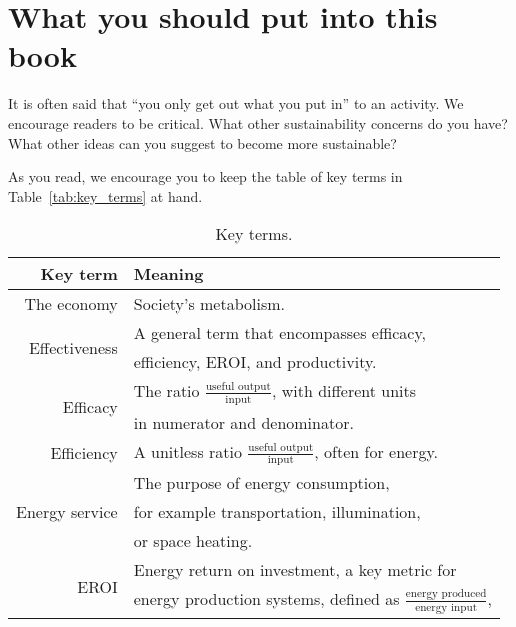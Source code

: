 {\section*{What you should put into this book} 

It is often said that ``you only get out what you put in'' to an activity.
We encourage readers to be critical.
What other sustainability concerns do you have?
What other ideas can you suggest to become more sustainable?

As you read, we encourage you to keep the table of key terms in Table~\ref{tab:key_terms} at hand.

\begin{table}[h!]
\caption{Key terms.}
\centering
\begin{tabular}{r l}
\toprule
Key term              & Meaning  \\ 
\midrule  
The economy           & Society's metabolism. \vspace{4mm} \\
%
\multirow{2}{*}{Effectiveness}  & A general term that encompasses efficacy, \\
                                & efficiency, EROI, and productivity. \vspace{4mm} \\
%
\multirow{2}{*}{Efficacy}   & The ratio $\frac{\text{useful output}}{\text{input}}$, with different units \\
                            & in numerator and denominator. \vspace{4mm} \\
%
Efficiency            & A unitless ratio $\frac{\text{useful output}}{\text{input}}$, often for energy. \vspace{4mm} \\
%
\multirow{3}{*}{Energy service}   & The purpose of energy consumption, \\
                                  & for example transportation, illumination, \\
                                  & or space heating. \vspace{4mm} \\
%
\multirow{3}{*}{EROI} & Energy return on investment, a key metric for \\
                      & energy production systems, defined as $\frac{\text{energy produced}}{\text{energy input}}$, \\

\end{tabular}
\end{table}}
